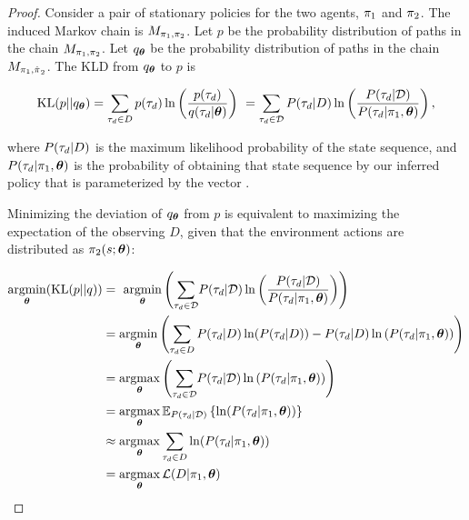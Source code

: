     \begin{proof}
        Consider a pair of stationary policies for the two agents, $\pi_{1}$ and $\pi_{2}$. The induced Markov
        chain is $M_{\pi_{1}, \pi_{2}}$. Let $p$ be the probability distribution of paths in the chain
        $M_{\pi_{1}, \pi_{2}}$. Let $q_{\boldsymbol{\mathbb{\theta}}}$ be the probability distribution of paths in the chain
        $M_{\pi_{1}, \hat{\pi_{}}_2}$. The \ac{KLD} from $q_{\boldsymbol{\mathbb{\theta}}}$ to $p$ is

        \begin{equation*}\label{eq:traj_kl_div}
            \text{KL}(p || q_{\boldsymbol{\mathbb{\theta}}}) = \sum_{\tau_d \in D} p(\tau_d) \ln \left( \frac{p(\tau_d)}
                                                {q(\tau_d|\boldsymbol{\mathbb{\theta}})} \right)\
                = \sum_{\tau_d \in \mathcal{D}} P(\tau_d|D) \ln \left( \frac{P(\tau_d|\mathcal{D})}
                                                {P(\tau_d|\pi_{1},\boldsymbol{\mathbb{\theta}})} \right),
        \end{equation*}

        \noindent
        where $P(\tau_d|D)$ is the maximum likelihood probability of the state sequence, and
        $P(\tau_d|\pi_{1},\boldsymbol{\mathbb{\theta}})$ is the probability of obtaining that state sequence by our inferred policy
        that is parameterized by the vector \paramVec.

        Minimizing the deviation of $q_{\boldsymbol{\mathbb{\theta}}}$ from $p$ is equivalent to maximizing the expectation of the
        observing $D$, given that the environment actions are distributed as $\pi_{2}(s; \boldsymbol{\mathbb{\theta}})$:

        \begin{equation}\label{eq:min_kld}
            \begin{aligned}
                \mathop{\mathrm{argmin}}_{\boldsymbol{\mathbb{\theta}}}(\text{KL}(p || q)) & = \
                    \mathop{\mathrm{argmin}}_{\boldsymbol{\mathbb{\theta}}}\left(\sum_{\tau_d \in  \mathcal{D}}\!  P(\tau_d|\mathcal{D})
                    \ln\left(\frac{P(\tau_d|\mathcal{D})}{P(\tau_d|\pi_{1},\boldsymbol{\mathbb{\theta}})}\right)\right)\\
                & = \mathop{\mathrm{argmin}}_{\boldsymbol{\mathbb{\theta}}}\left(\sum_{\tau_d \in D} P(\tau_d|D) \ln(P(\tau_d|D)) -
                    P(\tau_d|D) \ln\left(P(\tau_d|\pi_{1},\boldsymbol{\mathbb{\theta}})\right)\right)\\
                & = \mathop{\mathrm{argmax}}_{\boldsymbol{\mathbb{\theta}}}\left(\sum_{\tau_d \in \mathcal{D}}\!  P(\tau_d|\mathcal{D})
                    \ln\left(P(\tau_d|\pi_{1},\boldsymbol{\mathbb{\theta}})\right)\right)\\
                & = \mathop{\mathrm{argmax}}_{\boldsymbol{\mathbb{\theta}}}\mathbb{E}_{P(\tau_d|\mathcal{D})}\left\{\ln(P(\tau_d|\pi_{1},\boldsymbol{\mathbb{\theta}}))\right\} \\
                &\approx \mathop{\mathrm{argmax}}_{\boldsymbol{\mathbb{\theta}}} \sum_{\tau_d \in D}  \ln(P(\tau_d|\pi_{1},\boldsymbol{\mathbb{\theta}}))\\
                & =\mathop{\mathrm{argmax}}_{\boldsymbol{\mathbb{\theta}}} \mathcal{L}(D|\pi_{1},\boldsymbol{\mathbb{\theta}})
            \end{aligned}
        \end{equation}


\end{proof}
